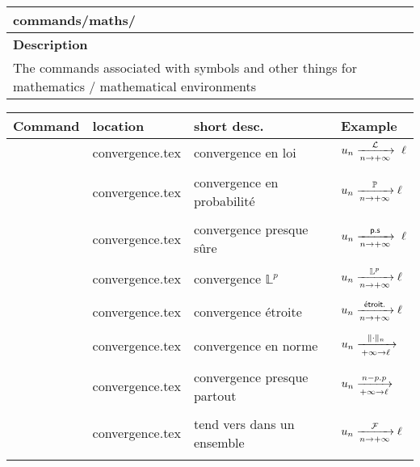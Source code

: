 \noindent\begin{tabularx}{\linewidth}{X}
	\toprule
	\textbf{commands/maths/\faAsterisk} \\
	\midrule
	\textbf{Description} \\
	The commands associated with symbols and other things for mathematics / mathematical environments \\
	\midrule
\end{tabularx}
\noindent\begin{tabularx}{\linewidth}{XXXX}
	\textbf{Command} & \textbf{location} & \textbf{short desc.} & \textbf{Example} \\
	\midrule
	\texttt{\cvl} & convergence.tex & convergence en loi & $u_n \cvl{n}{+\infty} \ell$ \\ \\

	\texttt{\cvp} & convergence.tex & convergence en probabilité & $u_n \cvp{n}{+\infty} \ell$ \\ \\

	\texttt{\cvps} & convergence.tex & convergence presque sûre & $u_n \cvps{n}{+\infty} \ell$ \\ \\

	\texttt{\cvL} & convergence.tex & convergence $\mathds L^p$ & $u_n \cvL{p}{n}{+\infty} \ell$ \\ \\

	\texttt{\cvetr} & convergence.tex & convergence étroite & $u_n \cvetr{n}{+\infty} \ell$ \\ \\

	\texttt{\cvnorme} & convergence.tex & convergence en norme & $u_n \cvnorme{n}{+\infty} \ell$ \\ \\

	\texttt{\cvpp} & convergence.tex & convergence presque partout & $u_n \cvpp{n}{+\infty} \ell$ \\ \\

	\texttt{\tendset} & convergence.tex & tend vers dans un ensemble & $u_n \tendset{n}{+\infty}{\mathcal F} \ell$ \\ \\

	\midrule


\end{tabularx}
